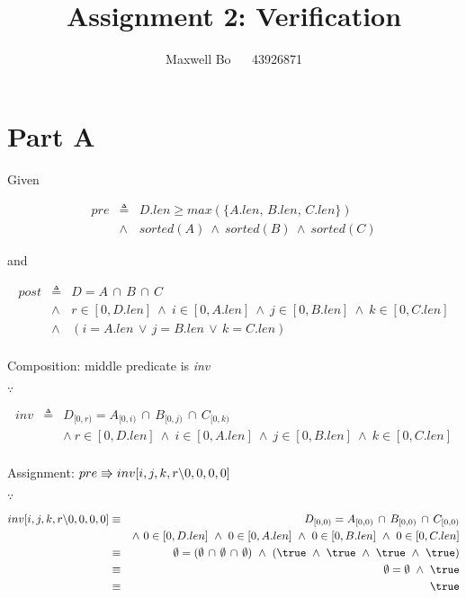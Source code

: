 \documentclass{article}
\title{\bf Assignment 2: Verification}
\author{Maxwell Bo  ~~ 43926871}
\begin{document}
\maketitle

\section{Part A}

Given

\begin{eqnarray*}
pre & \triangleq & D.len \geqslant max(\{A.len,\, B.len,\, C.len\})\\
    & \land & sorted(A) ~\land~ sorted(B) ~\land~ sorted(C)
\end{eqnarray*}

and

\begin{eqnarray*}
post & \triangleq & D = A\, \cap\, B\, \cap\, C\\
     & \land & r \in [0, D.len] ~\land~ i \in [0, A.len] ~\land~ j \in [0, B.len] ~\land~ k \in [0, C.len]\\
     & \land & (i = A.len\, \lor\, j = B.len\, \lor\, k = C.len)\\
\end{eqnarray*}


\DERIVE
{}
 {Composition: middle predicate is \textit{inv}}
\ENDDERIVE

$\because$

\begin{eqnarray*}
inv & \triangleq & D_{[0, r)} = A_{[0, i)}\, \cap\, B_{[0, j)}\, \cap\, C_{[0, k)}\\
     && \land~ r \in [0, D.len] ~\land~ i \in [0, A.len] ~\land~ j \in [0, B.len] ~\land~ k \in [0, C.len]\\
\end{eqnarray*}

\DERIVE
{} {Assignment: $pre \Rrightarrow inv[i, j, k, r\backslash 0, 0, 0, 0]$}
\ENDDERIVE

$\because$

\begin{eqnarray*}
inv[i, j, k, r\backslash 0, 0, 0, 0] 
    & \equiv & D_{[0, 0)} = A_{[0, 0)}\, \cap\, B_{[0, 0)}\, \cap\, C_{[0, 0)}\\
     && \land~ 0 \in [0, D.len] ~\land~ 0 \in [0, A.len] ~\land~ 0 \in [0, B.len] ~\land~ 0 \in [0, C.len]\\
     & \equiv & \emptyset = (\emptyset\, \cap\, \emptyset\, \cap\, \emptyset) ~\land~ (\true ~\land~ \true ~\land~ \true ~\land~ \true)\\
     & \equiv & \emptyset = \emptyset ~\land~ \true\\
     & \equiv & \true
\end{eqnarray*}
\end{document}
